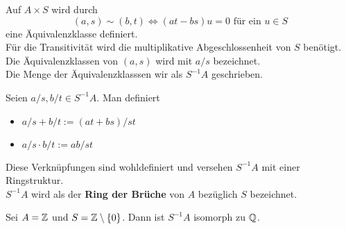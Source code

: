 	\begin{bem}
		Auf $A\times S$ wird durch 
		\[(a,s)\sim (b,t)\Leftrightarrow (at-bs)u=0\text{ für ein $u\in S$}\]
		eine Äquivalenzklasse definiert.\\
		Für die Transitivität wird die multiplikative Abgeschlossenheit von $S$ benötigt.\\
		Die Äquivalenzklassen von $(a,s)$ wird mit $a/s$ bezeichnet.\\
		Die Menge der Äquivalenzklasssen wir als $S^{-1}A$ geschrieben.
	\end{bem}

	\begin{definition}		
		Seien $a/s,b/t\in S^{-1}A$. Man definiert
		\begin{itemize}
			\item $a/s+b/t:=(at+bs)/st$
			\item $a/s\cdot b/t:=ab/st$
		\end{itemize}
	\end{definition}

	\begin{definition}
		Diese Verknüpfungen sind wohldefiniert und versehen $S^{-1}A$ mit einer Ringstruktur.\\
		$S^{-1}A$ wird als der \textbf{Ring der Brüche} von $A$ bezüglich $S$ bezeichnet.
	\end{definition}

	\begin{exm}
		Sei $A=\mathbb{Z}$ und $S=\mathbb{Z}\setminus\{0\}$. Dann ist $S^{-1}A$ isomorph zu $\mathbb{Q}$.
	\end{exm}


